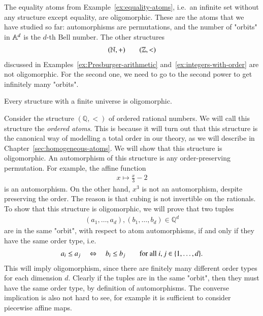 \begin{myexample}\label{ex:summary-oligomorphic}
	The equality atoms from Example~\ref{ex:equality-atoms}, i.e.~an infinite set without any structure except equality, are oligomorphic. These are the atoms that we have studied so far: automorphisms are permutations, and the number of "orbits" in $\mathbb A^d$ is the $d$-th Bell number. The other structures 
\begin{align*}
({\mathbb N},+) \qquad ({\mathbb Z},<)
\end{align*}
discussed in Examples~\ref{ex:Presburger-arithmetic} and~\ref{ex:integers-with-order} are not oligomorphic. For the second one, we need to go to the second power to get infinitely many "orbits". 
\end{myexample}

	
\begin{myexample}
	Every structure with a finite universe is oligomorphic.
\end{myexample}

\begin{myexample}
	\label{ex:order-atoms}
    Consider the structure  $(\mathbb Q, <)$ of ordered rational numbers. We will call this structure the \emph{ordered atoms}. This is because it will turn out that this structure is the canonical way of modelling a total order in our theory, as we will describe in Chapter~\ref{sec:homogeneous-atoms}.  We will show that this structure is oligomorphic. An automorphism of this structure is any order-preserving permutation. For example, the affine function
    \begin{align*}
    x \mapsto  \frac x 3 - 2
    \end{align*}
    is an automorphism. On the other hand, $x^3$ is not an automorphism, despite preserving the order. The reason is that cubing is not invertible on the rationals. To show that this structure is oligomorphic, we will prove that two tuples 
    \begin{align*}
    (a_1,\ldots,a_d), (b_1,\ldots,b_d) \in \mathbb Q^d
    \end{align*}
    are in the same "orbit", with respect to atom automorphisms, if and only if they have the same order type, i.e.
    \begin{align*}
    a_i \leq a_j \quad \Leftrightarrow \quad b_i \leq  b_j \qquad \text{for all $i,j \in \{1,\ldots,d\}$.}
    \end{align*}
    This will imply oligomorphism, since there are finitely many different order types for each dimension $d$. 
    Clearly if the tuples are in the same "orbit", then they must have the same order type, by definition of automorphisms. The converse implication is also not hard to see, for example it is sufficient to consider piecewise affine maps. 
\end{myexample}

